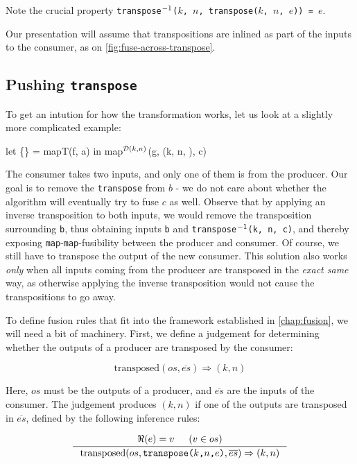Note the crucial property \texttt{transpose\(^{-1}\)($k$, $n$,
  transpose($k$, $n$, $e$))~=~$e$}.

Our presentation will assume that transpositions are inlined as part
of the inputs to the consumer, as on \cref{fig:fuse-across-transpose}.

\subsection{Pushing \texttt{transpose}}

To get an intution for how the transformation works, let us look at a
slightly more complicated example:

\begin{colorcode}
let \{\} = mapT(f, a) in
map\(^{\mathcal{D}(k,n)}\)(g, (k, n, ), c)
\end{colorcode}

The consumer takes two inputs, and only one of them is from the
producer.  Our goal is to remove the \texttt{transpose} from $b$ - we
do not care about whether the algorithm will eventually try to fuse
$c$ as well.  Observe that by applying an inverse transposition to
both inputs, we would remove the transposition surrounding \texttt{b},
thus obtaining inputs \texttt{b} and
\texttt{transpose\(^{-1}\)(k, n, c)}, and thereby exposing
\texttt{map}-\texttt{map}-fusibility between the producer and
consumer.  Of course, we still have to transpose the output of the new
consumer.  This solution also works \textit{only} when all inputs
coming from the producer are transposed in the \textit{exact same}
way, as otherwise applying the inverse transposition would not cause
the transpositions to go away.

To define fusion rules that fit into the framework established in
\cref{chap:fusion}, we will need a bit of machinery.  First, we define
a judgement for determining whether the outputs of a producer are
transposed by the consumer:

\[
\boxed{
  \text{transposed}(os,\overline{es}) \Rightarrow (k,n)
}
\]

Here, $os$ must be the outputs of a producer, and $\overline{es}$ are
the inputs of the consumer.  The judgement produces $(k,n)$ if one of
the outputs are transposed in $\overline{es}$, defined by the
following inference rules:

\[
\inference{
  \Re(e) = v
  &
  (v \in os)
}{
  \text{transposed}(os, \texttt{transpose($k$,$n$,$e$)}, \overline{es}) \Rightarrow (k,n)
}
\]

